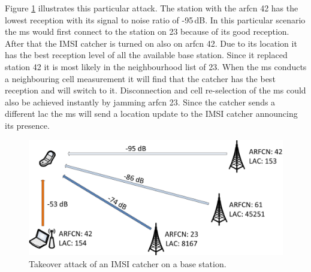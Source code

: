Figure \ref{fig:takeover_attack} illustrates this particular attack.
The station with the \gls{arfcn} 42 has the lowest reception with its signal to noise ratio of -95\,dB.
In this particular scenario the \gls{ms} would first connect to the station on 23 because of its good reception.
After that the IMSI catcher is turned on also on \gls{arfcn} 42.
Due to its location it has the best reception level of all the available base station.
Since it replaced station 42 it is most likely in the neighbourhood list of 23.
When the \gls{ms} conducts a neighbouring cell measurement it will find that the catcher has the best reception and will switch to it.
Disconnection and cell re-selection of the \gls{ms} could also be achieved instantly by jamming \gls{arfcn} 23.
Since the catcher sends a different \gls{lac} the \gls{ms} will send a location update to the IMSI catcher announcing its presence.
\begin{figure}
\centering
\includegraphics{../Images/replace_attack}
\caption{Takeover attack of an IMSI catcher on a base station.}
\label{fig:takeover_attack}
\end{figure}